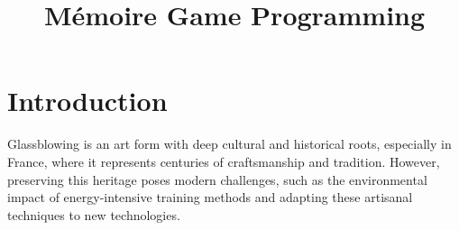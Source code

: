 \documentclass{rapportcs}
\title{Mémoire Game Programming}
\begin{document}




    




    \fairemarges %
    \fairepagedegarde %
    
    \begin{center}
        \begin{abstract}
        \end{abstract}
    \end{center}
    \newpage

    \begingroup %
    \color{blue}
    \renewcommand*\contentsname{Table of contents}
    \tabledematieres %
    \endgroup




    \section{Introduction}

    Glassblowing is an art form with deep cultural and historical roots, especially in France, where it represents centuries of craftsmanship and tradition. However, preserving this heritage poses modern challenges, such as the environmental impact of energy-intensive training methods and adapting these artisanal techniques to new technologies.
\end{document}
